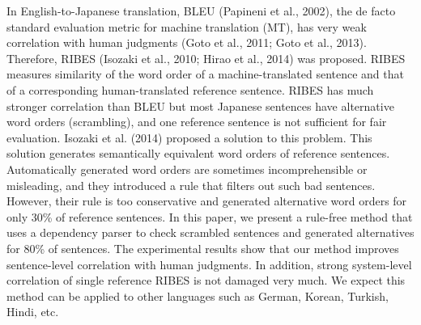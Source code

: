 In English-to-Japanese translation, BLEU (Papineni et al., 2002), the de facto standard evaluation metric for machine translation (MT), has very weak correlation with human judgments (Goto et al., 2011; Goto et al., 2013). Therefore, RIBES (Isozaki et al., 2010; Hirao et al., 2014) was proposed. RIBES measures similarity of the word order of a machine-translated sentence and that of a corresponding human-translated reference sentence. RIBES has much stronger correlation than BLEU but most Japanese sentences have alternative word orders (scrambling), and one reference sentence is not sufficient for fair evaluation. Isozaki et al. (2014) proposed a solution to this problem. This solution generates semantically equivalent word orders of reference sentences. Automatically generated word orders are sometimes incomprehensible or misleading, and they introduced a rule that filters out such bad sentences. However, their rule is too conservative and generated alternative word orders for only 30\% of reference sentences. In this paper, we present a rule-free method that uses a dependency parser to check scrambled sentences and generated alternatives for 80\% of sentences. The experimental results show that our method improves sentence-level correlation with human judgments. In addition, strong system-level correlation of single reference RIBES is not damaged very much. We expect this method can be applied to other languages such as German, Korean, Turkish, Hindi, etc.
